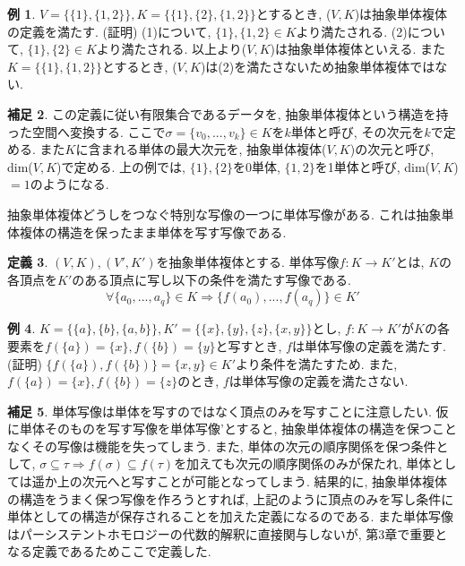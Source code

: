 \documentclass[a4paper]{jsarticle}
\theoremstyle{definition}
\newtheorem{dfn}{定義}[section]
\newtheorem{exam}[dfn]{例}
\newtheorem{hsk}[dfn]{補足}
\begin{document}
\begin{exam}
    $V=\{ \{1\}, \{1,2\}\}, K=\{\{1\}, \{2\}, \{1,2\} \}$とするとき, ($V,K$)は抽象単体複体の定義を満たす. (証明) (1)について, $\{1\}, \{1,2\}\in K$より満たされる. (2)について, $\{1\}, \{2\}\in K$より満たされる. 以上より($V,K$)は抽象単体複体といえる. また$K=\{\{1\}, \{1,2\} \}$とするとき, ($V,K$)は(2)を満たさないため抽象単体複体ではない.
\end{exam}
\begin{hsk}
    この定義に従い有限集合であるデータを, 抽象単体複体という構造を持った空間へ変換する. ここで$\sigma=\{v_0,...,v_k\}\in K$を$k$単体と呼び, その次元を$k$で定める. また$K$に含まれる単体の最大次元を, 抽象単体複体($V,K$)の次元と呼び, dim($V,K$)で定める. 上の例では, $\{1\}, \{2\}$を0単体, $\{1,2\}$を1単体と呼び, dim($V,K$)$=1$のようになる.\\
\end{hsk}
抽象単体複体どうしをつなぐ特別な写像の一つに単体写像がある. これは抽象単体複体の構造を保ったまま単体を写す写像である.
\begin{dfn}
    $(V, K), (V', K')$を抽象単体複体とする. 単体写像$f:K\rightarrow K'$とは, $K$の各頂点を$K'$のある頂点に写し以下の条件を満たす写像である.
\begin{equation}
    \forall \{a_0,...,a_q\}\in K\Rightarrow \{f(a_0),...,f(a_q)\}\in K'
\end{equation}
\end{dfn}
\begin{exam}
    $K=\{ \{a\}, \{b\}, \{a,b\}\}, K'=\{ \{x\},\{y\}, \{z\}, \{x,y\}\}$とし, $f:K\rightarrow K'$が$K$の各要素を$f(\{a\})=\{x\}, f(\{b\})=\{y\}$と写すとき, $f$は単体写像の定義を満たす. (証明) $\{f(\{a\}), f(\{b\})\}=\{x,y\}\in K'$より条件を満たすため. また, $f(\{a\})=\{x\}, f(\{b\})=\{z\}$のとき, $f$は単体写像の定義を満たさない.
\end{exam}
\begin{hsk}
    単体写像は単体を写すのではなく頂点のみを写すことに注意したい. 仮に単体そのものを写す写像を単体写像'とすると, 抽象単体複体の構造を保つことなくその写像は機能を失ってしまう. また, 単体の次元の順序関係を保つ条件として, $\sigma\subseteq\tau \Rightarrow f(\sigma) \subseteq f(\tau)$を加えても次元の順序関係のみが保たれ, 単体としては遥か上の次元へと写すことが可能となってしまう. 結果的に, 抽象単体複体の構造をうまく保つ写像を作ろうとすれば, 上記のように頂点のみを写し条件に単体としての構造が保存されることを加えた定義になるのである. また単体写像はパーシステントホモロジーの代数的解釈に直接関与しないが, 第3章で重要となる定義であるためここで定義した.\\
\end{hsk}
\end{document}
